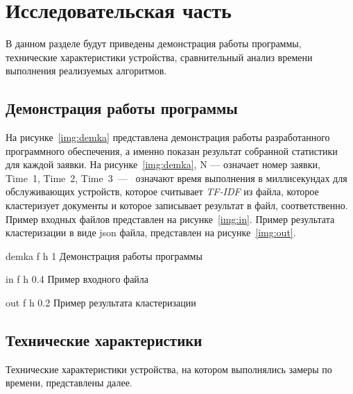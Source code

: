 \chapter{Исследовательская часть}

В данном разделе будут приведены демонстрация работы программы, технические характеристики устройства, сравнительный анализ времени выполнения реализуемых алгоритмов.


\section{Демонстрация работы программы}

На рисунке~\ref{img:demka} представлена демонстрация работы разработанного программного обеспечения, а именно показан результат собранной статистики для каждой заявки. На рисунке~\ref{img:demka}, N --- означает номер заявки, Time~1, Time~2, Time~3~---~ означают время выполнения в миллисекундах для обслуживающих устройств, которое считывает \textit{TF-IDF} из файла, которое кластеризует документы и которое записывает результат в файл, соответственно.
Пример входных файлов представлен на рисунке~\ref{img:in}. 
Пример результата кластеризации в виде json файла, представлен на рисунке~\ref{img:out}.

{demka} %
{f} %
{h} %
{1\textwidth} %
{Демонстрация работы программы} %

{in} %
{f} %
{h} %
{0.4\textwidth} %
{Пример входного файла} %

{out} %
{f} %
{h} %
{0.2\textwidth} %
{Пример результата кластеризации} %

\clearpage

\section{Технические характеристики}

Технические характеристики устройства, на котором выполнялись замеры по времени, представлены далее.

